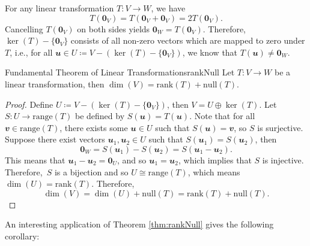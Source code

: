 \documentclass[math, code]{amznotes}
\theoremstyle{remark}
\newcommand{\zero}{\mathbf{0}}
\begin{document}
For any linear transformation $T \colon V \to W$, we have 
\begin{equation*}
    T(\zero_V) = T(\zero_V + \zero_V) = 2T(\zero_V).
\end{equation*}
Cancelling $T(\zero_V)$ on both sides yields $\zero_W = T(\zero_V)$. Therefore, $\ker(T) - \{\zero_V\}$ consists of all non-zero vectors which are mapped to zero under $T$, i.e., for all $\mathbfit{u} \in U \coloneqq V - (\ker(T) - \{\zero_V\})$, we know that $T(\mathbfit{u}) \neq \zero_W$. 
\begin{thmbox}{Fundamental Theorem of Linear Transformations}{rankNull}
    Let $T \colon V \to W$ be a linear transformation, then $\dim(V) = \mathrm{rank}(T) + \mathrm{null}(T)$.
    \tcblower
    \begin{proof}
        Define $U \coloneqq V - (\ker(T) - \{\zero_V\})$, then $V = U \oplus \ker(T)$. Let $S \colon U \to \mathrm{range}(T)$ be defined by $S(\mathbfit{u}) = T(\mathbfit{u})$. Note that for all $\mathbfit{v} \in \mathrm{range}(T)$, there exists some $\mathbfit{u} \in U$ such that $S(\mathbfit{u}) = \mathbfit{v}$, so $S$ is surjective. Suppose there exist vectors $\mathbfit{u}_1, \mathbfit{u}_2 \in U$ such that $S(\mathbfit{u}_1) = S(\mathbfit{u}_2)$, then
        \begin{equation*}
            \zero_W = S(\mathbfit{u}_1) - S(\mathbfit{u}_2) = S(\mathbfit{u}_1 - \mathbfit{u}_2).
        \end{equation*}
        This means that $\mathbfit{u}_1 - \mathbfit{u}_2 = \zero_U$, and so $\mathbfit{u}_1 = \mathbfit{u}_2$, which implies that $S$ is injective. Therefore,~$S$ is a bijection and so $U \cong \mathrm{range}(T)$, which means $\dim(U) = \mathrm{rank}(T)$. Therefore,
        \begin{equation*}
            \dim(V) = \dim(U) + \mathrm{null}(T) = \mathrm{rank}(T) + \mathrm{null}(T).
        \end{equation*}
    \end{proof}
\end{thmbox}
An interesting application of Theorem \ref{thm:rankNull} gives the following corollary:
\end{document}
